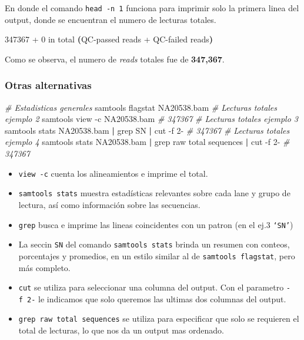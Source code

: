 \documentclass[
]{article}
\newenvironment{Shaded}{\begin{snugshade}}{\end{snugshade}}
\newcommand{\AttributeTok}[1]{\textcolor[rgb]{0.77,0.63,0.00}{#1}}
\newcommand{\CommentTok}[1]{\textcolor[rgb]{0.56,0.35,0.01}{\textit{#1}}}
\newcommand{\ErrorTok}[1]{\textcolor[rgb]{0.64,0.00,0.00}{\textbf{#1}}}
\newcommand{\ExtensionTok}[1]{#1}
\newcommand{\FunctionTok}[1]{\textcolor[rgb]{0.00,0.00,0.00}{#1}}
\newcommand{\KeywordTok}[1]{\textcolor[rgb]{0.13,0.29,0.53}{\textbf{#1}}}
\newcommand{\NormalTok}[1]{#1}
\newcommand{\StringTok}[1]{\textcolor[rgb]{0.31,0.60,0.02}{#1}}
\providecommand{\tightlist}{%
  \setlength{\itemsep}{0pt}\setlength{\parskip}{0pt}}
\begin{document}
En donde el comando \texttt{head\ -n\ 1} funciona para imprimir solo la
primera linea del output, donde se encuentran el numero de lecturas
totales.

\begin{Shaded}
\begin{Highlighting}[]
\ExtensionTok{347367}\NormalTok{ + 0 in total }\ErrorTok{(}\ExtensionTok{QC{-}passed}\NormalTok{ reads + QC{-}failed reads}\KeywordTok{)}
\end{Highlighting}
\end{Shaded}

Como se observa, el numero de \emph{reads} totales fue de
\textbf{347,367}.

\hypertarget{otras-alternativas}{%
\subsubsection{Otras alternativas}\label{otras-alternativas}}

\begin{Shaded}
\begin{Highlighting}[]
\CommentTok{\# Estadisticas generales}
\ExtensionTok{samtools}\NormalTok{ flagstat NA20538.bam}
\CommentTok{\# Lecturas totales ejemplo 2}
\ExtensionTok{samtools}\NormalTok{ view }\AttributeTok{{-}c}\NormalTok{ NA20538.bam }\CommentTok{\# 347367}
\CommentTok{\# Lecturas totales ejemplo 3}
\ExtensionTok{samtools}\NormalTok{ stats NA20538.bam }\KeywordTok{|} \FunctionTok{grep} \StringTok{\textquotesingle{}SN\textquotesingle{}} \KeywordTok{|} \FunctionTok{cut} \AttributeTok{{-}f}\NormalTok{ 2{-} }\CommentTok{\# 347367}
\CommentTok{\# Lecturas totales ejemplo 4}
\ExtensionTok{samtools}\NormalTok{ stats NA20538.bam }\KeywordTok{|} \FunctionTok{grep} \StringTok{\textquotesingle{}raw total sequences\textquotesingle{}} \KeywordTok{|} \FunctionTok{cut} \AttributeTok{{-}f}\NormalTok{ 2{-} }\CommentTok{\# 347367}
\end{Highlighting}
\end{Shaded}

\begin{itemize}
\tightlist
\item
  \texttt{view\ -c} cuenta los alineamientos e imprime el total.
\item
  \texttt{samtools\ stats} muestra estadísticas relevantes sobre cada
  lane y grupo de lectura, así como información sobre las secuencias.
\item
  \texttt{grep} busca e imprime las lineas coincidentes con un patron
  (en el ej.3 \texttt{‘SN’})
\item
  La seccin \texttt{SN} del comando \texttt{samtools\ stats} brinda un
  resumen con conteos, porcentajes y promedios, en un estilo similar al
  de \texttt{samtools\ flagstat}, pero más completo.
\item
  \texttt{cut} se utiliza para seleccionar una columna del output. Con
  el parametro \texttt{-f\ 2-} le indicamos que solo queremos las
  ultimas dos columnas del output.
\item
  \texttt{grep\ \textquotesingle{}raw\ total\ sequences\textquotesingle{}}
  se utiliza para especificar que solo se requieren el total de
  lecturas, lo que nos da un output mas ordenado.
\end{itemize}
\end{document}
